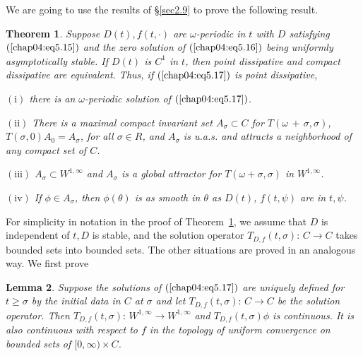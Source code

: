 \documentclass{surv-l}
\theoremstyle{plain}
\newtheorem{theorem}{Theorem}[section]
\newtheorem{lemma}[theorem]{Lemma}
\theoremstyle{definition}
\numberwithin{equation}{section}
\numberwithin{figure}{chapter}
\begin{document}
We are going to use the results of \S \ref{sec2.9} to prove the following result.

\begin{theorem}\label{thm4.5.6} Suppose $D(t), f(t, \cdot)$ are $\omega$-periodic in $t$ with $D$ satisfying $(\ref{chap04:eq5.15})$ and the zero solution of $(\ref{chap04:eq5.16})$ being uniformly asymptotically stable. If $D(t)$ is $C^{1}$ in $t$, then point dissipative and compact dissipative are equivalent. Thus, if $(\ref{chap04:eq5.17})$ is point dissipative,

$\mathrm{(i)}$ there is an $\omega$-periodic solution of $(\ref{chap04:eq5.17})$.

$\mathrm{(ii)}$ There is a maximal compact invariant set $A_{\sigma}\subset C$ for $T(\omega\,+\,\sigma, \sigma)$, $T(\sigma, 0)A_{0}=A_{\sigma}$, for all $\sigma\in R$, and $A_{\sigma}$ is u.a.s. and attracts a neighborhood of any compact set of $C$.

$\mathrm{(iii)}$ $A_{\sigma}\subset W^{1,\infty}$ and $A_{\sigma}$ is a global attractor for $T(\omega+\sigma, \sigma)$ in $W^{1,\infty}$.

$\mathrm{(iv)}$ If $\phi\in A_{\sigma}$, then $\phi(\theta)$ is as smooth in $\theta$ as $D(t)$, $f(t, \psi)$ are in $t, \psi$.
\end{theorem}

For simplicity in notation in the proof of Theorem~\ref{thm4.5.6}, we assume that $D$ is independent of $t, D$ is stable, and the solution operator $T_{D,f}(t, \sigma):\,C\rightarrow C$ takes bounded sets into bounded sets. The other situations are proved in an analogous way. We first prove

\begin{lemma}\label{lem4.5.7} Suppose the solutions of $(\ref{chap04:eq5.17})$ are uniquely defined for $t\geq\sigma$ by the initial data in $C$ at $\sigma$ and let $T_{D,f}(t, \sigma):\,C\rightarrow C$ be the solution operator. Then $T_{D,f}(t, \sigma):\,W^{1,\infty}\rightarrow W^{1,\infty}$ and $T_{D,f}(t, \sigma)\phi$ is continuous. It is also continuous with respect to $f$ in the topology of uniform convergence on bounded sets of $[0, \infty)\times C$.
\end{lemma}
\end{document}
